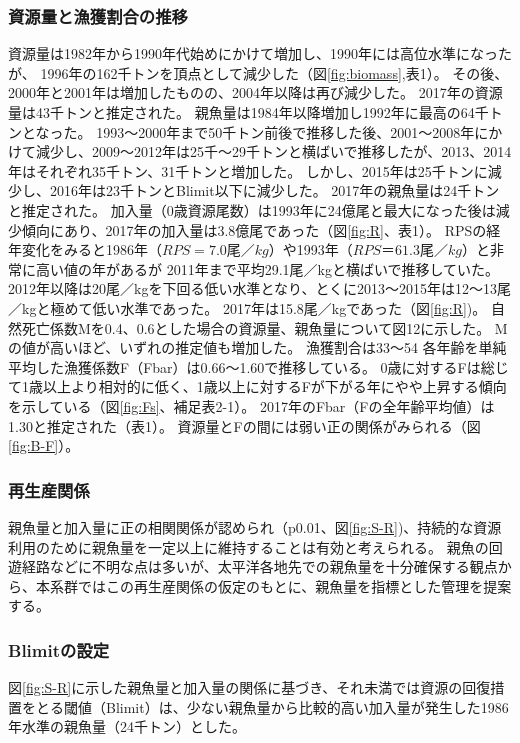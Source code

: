 \subsubsection{資源量と漁獲割合の推移}
資源量は1982年から1990年代始めにかけて増加し、1990年には高位水準になったが、
1996年の162千トンを頂点として減少した（図\ref{fig:biomass},表1）。
その後、2000年と2001年は増加したものの、2004年以降は再び減少した。
2017年の資源量は43千トンと推定された。
親魚量は1984年以降増加し1992年に最高の64千トンとなった。
1993～2000年まで50千トン前後で推移した後、2001～2008年にかけて減少し、2009～2012年は25千～29千トンと横ばいで推移したが、2013、2014年はそれぞれ35千トン、31千トンと増加した。
しかし、2015年は25千トンに減少し、2016年は23千トンとBlimit以下に減少した。
2017年の親魚量は24千トンと推定された。
加入量（0歳資源尾数）は1993年に24億尾と最大になった後は減少傾向にあり、2017年の加入量は3.8億尾であった（図\ref{fig:R}、表1）。
RPSの経年変化をみると1986年（$RPS = 7.0尾／kg$）や1993年（$RPS ＝ 61.3尾／kg$）と非常に高い値の年があるが
2011年まで平均29.1尾／kgと横ばいで推移していた。
2012年以降は20尾／kgを下回る低い水準となり、とくに2013～2015年は12～13尾／kgと極めて低い水準であった。
2017年は15.8尾／kgであった（図\ref{fig:R})。
自然死亡係数Mを0.4、0.6とした場合の資源量、親魚量について図12に示した。
Mの値が高いほど、いずれの推定値も増加した。
漁獲割合は33～54%
各年齢を単純平均した漁獲係数F（Fbar）は0.66～1.60で推移している。
0歳に対するFは総じて1歳以上より相対的に低く、1歳以上に対するFが下がる年にやや上昇する傾向を示している（図\ref{fig:Fs}、補足表2-1）。
2017年のFbar（Fの全年齢平均値）は1.30と推定された（表1）。
資源量とFの間には弱い正の関係がみられる（図\ref{fig:B-F}）。

\subsubsection{再生産関係}
親魚量と加入量に正の相関関係が認められ（p0.01、図\ref{fig:S-R})、持続的な資源利用のために親魚量を一定以上に維持することは有効と考えられる。
親魚の回遊経路などに不明な点は多いが、太平洋各地先での親魚量を十分確保する観点から、本系群ではこの再生産関係の仮定のもとに、親魚量を指標とした管理を提案する。

\subsubsection{Blimitの設定}   図\ref{fig:S-R}に示した親魚量と加入量の関係に基づき、それ未満では資源の回復措置をとる閾値（Blimit）は、少ない親魚量から比較的高い加入量が発生した1986年水準の親魚量（24千トン）とした。

